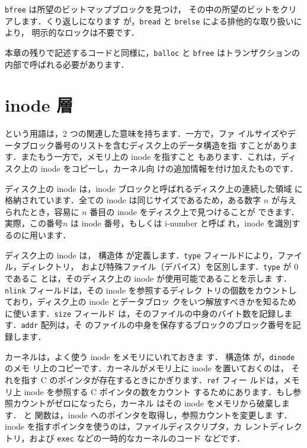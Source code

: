 \texttt{bfree}
は所望のビットマップブロックを見つけ，
その中の所望のビットをクリアします．くり返しになります
が，\texttt{bread} と \texttt{brelse} による排他的な取り扱いにより，
明示的なロックは不要です．

本章の残りで記述するコードと同様に，\texttt{balloc} と \texttt{bfree}
はトランザクションの内部で呼ばれる必要があります．
\section{inode 層}

 という用語は，2 つの関連した意味を持ちます．一方で，ファ
イルサイズやデータブロック番号のリストを含むディスク上のデータ構造を指
すことがあります．またもう一方で，メモリ上の inode を指すこと
もあります．これは，ディスク上の inode をコピーし，カーネル向
けの追加情報を付け加えたものです．

ディスク上の inode は，inode ブロックと呼ばれるディスク上の連続した領域
に格納されています．全ての inode は同じサイズであるため，ある数字 $n$
が与えられたとき，容易に $n$ 番目の inode をディスク上で見つけることが
できます．実際，この番号$n$ は inode 番号，もしくは i-number と呼ば
れ，inode を識別するのに用います．

ディスク上の inode は， 構造体
が定義します．\texttt{type} フィールドにより，ファイル，ディレクトリ，
および特殊ファイル（デバイス）を区別します．\texttt{type} が 0 であるこ
とは，そのディスク上の inode が使用可能であることを示しま
す．\texttt{nlink} フィールドは，その inode を参照するディレク
トリの個数をカウントしており，ディスク上の inode とデータブロッ
クをいつ解放すべきかを知るために使います．\texttt{size} フィールド
は，そのファイルの中身のバイト数を記録します．\texttt{addr} 配列は，そ
のファイルの中身を保存するブロックのブロック番号を記
録します．

カーネルは，よく使う inode をメモリにいれておきま
す． 構造体
が，\texttt{dinode} のメモ
リ上のコピーです．カーネルがメモリ上に inode を置いておくのは，
それを指す C のポインタが存在するときにかぎります．\texttt{ref} フィー
ルドは，メモリ上 inode を参照する C ポインタの数をカウント
するためにあります．もし参照カウントがゼロになったら，カーネル
はその inode をメモリから破棄します． と 
関数は，inode へのポインタを取得し，参照カウントを変更しま
す．inode を指すポインタを使うのは，ファイルディスクリプタ，カ
レントディレクトリ，および \texttt{exec} などの一時的なカーネルのコード
などです．

